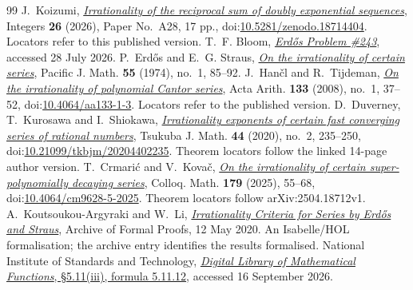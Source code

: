 \documentclass[11pt]{article}
\begin{document}
\begin{thebibliography}{99}
 J.~Koizumi,
  \href{https://math.colgate.edu/~integers/aa28/aa28.pdf}
  {\emph{Irrationality of the reciprocal sum of doubly exponential sequences}},
  Integers \textbf{26} (2026), Paper No.~A28, 17 pp.,
  doi:\href{https://doi.org/10.5281/zenodo.18714404}{10.5281/zenodo.18714404}.
  Locators refer to this published version.
 T.~F. Bloom,
  \href{https://www.erdosproblems.com/243}{\emph{Erd\H{o}s Problem \#243}},
  accessed 28 July 2026.
 P.~Erd\H{o}s and E.~G. Straus,
  \href{https://msp.org/pjm/1974/55-1/pjm-v55-n1-p08-s.pdf}
  {\emph{On the irrationality of certain series}}, Pacific J. Math.
  \textbf{55} (1974), no.~1, 85--92.
 J.~Han\v{c}l and R.~Tijdeman,
  \href{https://www.impan.pl/shop/en/publication/transaction/download/product/82186}
  {\emph{On the irrationality of polynomial Cantor series}},
  Acta Arith. \textbf{133} (2008), no.~1, 37--52,
  doi:\href{https://doi.org/10.4064/aa133-1-3}{10.4064/aa133-1-3}.
  Locators refer to the published version.
 D.~Duverney, T.~Kurosawa and I.~Shiokawa,
  \href{https://danielduverney.fr/documents/theorie-des-nombres/Tsukuba.pdf}
  {\emph{Irrationality exponents of certain fast converging series of rational
  numbers}}, Tsukuba J. Math. \textbf{44} (2020), no.~2, 235--250,
  doi:\href{https://doi.org/10.21099/tkbjm/20204402235}{10.21099/tkbjm/20204402235}.
  Theorem locators follow the linked 14-page author version.
 T.~Crmari\'{c} and V.~Kova\v{c},
  \href{https://arxiv.org/abs/2504.18712v1}
  {\emph{On the irrationality of certain super-polynomially decaying series}},
  Colloq. Math. \textbf{179} (2025), 55--68,
  doi:\href{https://doi.org/10.4064/cm9628-5-2025}{10.4064/cm9628-5-2025}.
  Theorem locators follow arXiv:2504.18712v1.
 A.~Koutsoukou-Argyraki and W.~Li,
  \href{https://isa-afp.org/entries/Irrational_Series_Erdos_Straus.html}
  {\emph{Irrationality Criteria for Series by Erd\H{o}s and Straus}},
  Archive of Formal Proofs, 12 May 2020. An Isabelle/HOL formalisation;
  the archive entry identifies the results formalised.
 National Institute of Standards and Technology,
  \href{https://dlmf.nist.gov/5.11.E12}{\emph{Digital Library of Mathematical
  Functions}, \S5.11(iii), formula 5.11.12}, accessed 16 September 2026.
\end{thebibliography}


\evidenceconcordancenewpage
\end{document}
